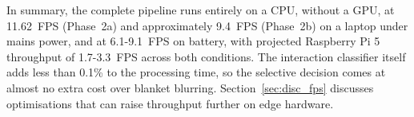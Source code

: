In summary, the complete pipeline runs entirely on a CPU, without a GPU, at
11.62~FPS (Phase~2a) and approximately 9.4~FPS (Phase~2b) on a laptop under mains
power, and at 6.1-9.1~FPS on battery, with projected Raspberry Pi 5 throughput of
1.7-3.3~FPS across both conditions. The interaction classifier
itself adds less than 0.1\% to the processing time, so the selective decision comes
at almost no extra cost over blanket blurring. Section~\ref{sec:disc_fps} discusses optimisations
that can raise throughput further on edge hardware.
